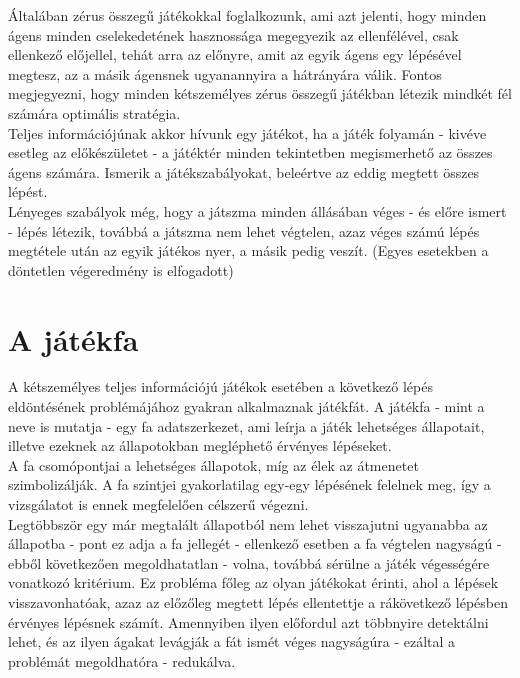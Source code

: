 Általában zérus összegű játékokkal foglalkozunk, ami azt jelenti, hogy minden ágens minden cselekedetének hasznossága megegyezik az ellenfélével, csak ellenkező előjellel, tehát arra az előnyre, amit az egyik ágens egy lépésével megtesz, az a másik ágensnek ugyanannyira a hátrányára válik. Fontos megjegyezni, hogy minden kétszemélyes zérus összegű játékban létezik mindkét fél számára optimális stratégia.\\

Teljes információjúnak akkor hívunk egy játékot, ha a játék folyamán - kivéve esetleg az előkészületet - a játéktér minden tekintetben megismerhető az összes ágens számára. Ismerik a játékszabályokat, beleértve az eddig megtett összes lépést.\\

Lényeges szabályok még, hogy a játszma minden állásában véges - és előre ismert - lépés létezik, továbbá a játszma nem lehet végtelen, azaz véges számú lépés megtétele után az egyik játékos nyer, a másik pedig veszít. (Egyes esetekben a döntetlen végeredmény is elfogadott)

\section{A játékfa}
A kétszemélyes teljes információjú játékok esetében a következő lépés eldöntésének problémájához gyakran alkalmaznak játékfát. A játékfa - mint a neve is mutatja - egy fa adatszerkezet, ami leírja a játék lehetséges állapotait, illetve ezeknek az állapotokban megléphető érvényes lépéseket.\\

A fa csomópontjai a lehetséges állapotok, míg az élek az átmenetet szimbolizálják. A fa szintjei gyakorlatilag egy-egy lépésének felelnek meg, így a vizsgálatot is ennek megfelelően célszerű végezni.\\

Legtöbbször egy már megtalált állapotból nem lehet visszajutni ugyanabba az állapotba - pont ez adja a fa jellegét - ellenkező esetben a fa végtelen nagyságú - ebből következően megoldhatatlan - volna, továbbá sérülne a játék végességére vonatkozó kritérium. Ez probléma főleg az olyan játékokat érinti, ahol a lépések visszavonhatóak, azaz az előzőleg megtett lépés ellentettje a rákövetkező lépésben érvényes lépésnek számít. Amennyiben ilyen előfordul azt többnyire detektálni lehet, és az ilyen ágakat levágják a fát ismét véges nagyságúra - ezáltal a problémát megoldhatóra - redukálva.\\

